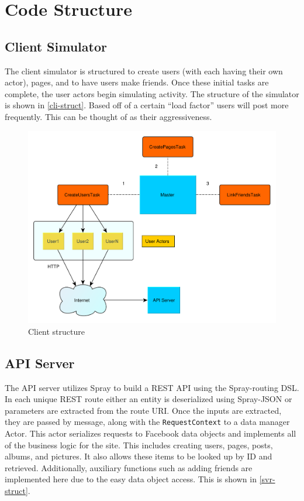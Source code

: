 \documentclass{article}
\begin{document}
\section*{Code Structure}

\subsection*{Client Simulator}

The client simulator is structured to create users (with each having their own actor), pages, and to have users make friends. Once these initial tasks are complete, the user actors begin simulating activity. The structure of the simulator is shown in \autoref{cli-struct}. Based off of a certain ``load factor'' users will post more frequently. This can be thought of as their aggressiveness.

\begin{figure}[H]
  \centering
  \includegraphics[scale=0.5]{diagrams/client-structure.pdf}
  \caption{Client structure}
  \label{cli-struct}
\end{figure}

\subsection*{API Server}
The API server utilizes Spray to build a REST API using the Spray-routing DSL. In each unique REST route either an entity is deserialized using Spray-JSON or parameters are extracted from the route URI. Once the inputs are extracted, they are passed by message, along with the \texttt{RequestContext} to a data manager Actor. This actor serializes requests to Facebook data objects and implements all of the business logic for the site. This includes creating users, pages, posts, albums, and pictures. It also allows these items to be looked up by ID and retrieved. Additionally, auxiliary functions such as adding friends are implemented here due to the easy data object access. This is shown in \autoref{svr-struct}.
\end{document}
